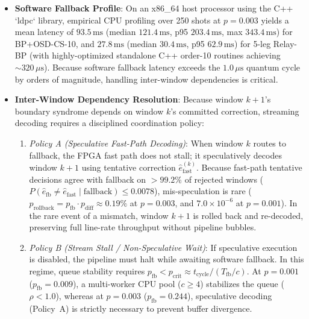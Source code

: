 \documentclass[journal]{IEEEtran}
\begin{document}
\begin{itemize}
    \item \textbf{Software Fallback Profile}: On an x86\_64 host processor using the C++ `ldpc` library, empirical CPU profiling over 250 shots at $p = 0.003$ yields a mean latency of $93.5\,\text{ms}$ (median $121.4\,\text{ms}$, p95 $203.4\,\text{ms}$, max $343.4\,\text{ms}$) for BP+OSD-CS-10, and $27.8\,\text{ms}$ (median $30.4\,\text{ms}$, p95 $62.9\,\text{ms}$) for 5-leg Relay-BP (with highly-optimized standalone C++ order-10 routines achieving $\sim 320\,\mu\text{s}$). Because software fallback latency exceeds the $1.0\,\mu\text{s}$ quantum cycle by orders of magnitude, handling inter-window dependencies is critical.
    \item \textbf{Inter-Window Dependency Resolution}: Because window $k+1$'s boundary syndrome depends on window $k$'s committed correction, streaming decoding requires a disciplined coordination policy:
    \begin{enumerate}
        \item \textit{Policy A (Speculative Fast-Path Decoding)}: When window $k$ routes to fallback, the FPGA fast path does not stall; it speculatively decodes window $k+1$ using tentative correction $\hat{e}_{\text{fast}}^{(k)}$. Because fast-path tentative decisions agree with fallback on $>99.2\%$ of rejected windows ($P(\hat{e}_{\text{fb}} \ne \hat{e}_{\text{fast}} \mid \text{fallback}) \le 0.0078$), mis-speculation is rare ($p_{\text{rollback}} = p_{\text{fb}} \cdot p_{\text{diff}} \approx 0.19\%$ at $p=0.003$, and $7.0 \times 10^{-6}$ at $p=0.001$). In the rare event of a mismatch, window $k+1$ is rolled back and re-decoded, preserving full line-rate throughput without pipeline bubbles.
        \item \textit{Policy B (Stream Stall / Non-Speculative Wait)}: If speculative execution is disabled, the pipeline must halt while awaiting software fallback. In this regime, queue stability requires $p_{\text{fb}} < p_{\text{crit}} \approx t_{\text{cycle}} / (T_{\text{fb}}/c)$. At $p=0.001$ ($p_{\text{fb}} = 0.009$), a multi-worker CPU pool ($c \ge 4$) stabilizes the queue ($\rho < 1.0$), whereas at $p=0.003$ ($p_{\text{fb}} = 0.244$), speculative decoding (Policy~A) is strictly necessary to prevent buffer divergence.
    \end{enumerate}
\end{itemize}
\end{document}
